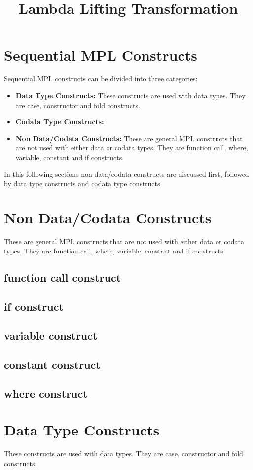\documentclass[11pt]{article}
\title{Lambda Lifting Transformation}
\begin{document}
\maketitle
\section {Sequential MPL Constructs} 
Sequential MPL constructs can be divided into three categories:
\begin{itemize}
  \item {\bf Data Type Constructs:} These constructs are used with data types. They are {\sf case}, {\sf constructor} and {\sf fold} constructs.
  \item {\bf Codata Type Constructs:}
  \item {\bf Non Data/Codata Constructs:} These are general MPL constructs that are not used with either data or codata types. They are {\sf function call}, {\sf where}, {\sf variable}, {\sf constant} and {\sf if} constructs.
\end{itemize}
In this following sections non data/codata constructs are discussed first, followed by data type constructs and codata type constructs.
\section {Non Data/Codata Constructs}
These are general MPL constructs that are not used with either data or codata types. They are {\sf function call}, {\sf where}, {\sf variable}, {\sf constant} and {\sf if} constructs.
\subsection {function call construct}
\subsection {if construct}
\subsection {variable construct}
\subsection {constant construct}
\subsection {where construct}

\section {Data Type Constructs}
These constructs are used with data types. They are {\sf case}, {\sf constructor} and {\sf fold} constructs.
\end{document}
